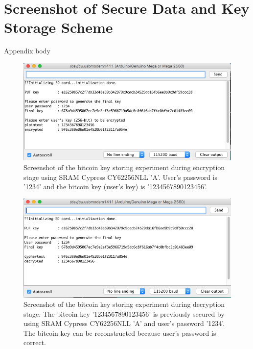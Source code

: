 \chapter{Screenshot of Secure Data and Key Storage Scheme}
\label{app:screenshot}
Appendix body

\begin{figure}[tph!]
    \centerline{\includegraphics[width={\textwidth}]{images/A_encrypt}}
    \caption{Screenshot of the bitcoin key storing experiment during encryption stage using SRAM Cypress CY62256NLL 'A'.
    User's password is '1234' and the bitcoin key (user's key) is '1234567890123456'.}
    \label{fig:A_encrypt}
\end{figure}

\begin{figure}[tph!]
    \centerline{\includegraphics[width={\textwidth}]{images/A_decrypt_correct}}
    \caption{Screenshot of the bitcoin key storing experiment during decryption stage. The bitcoin key '1234567890123456' is previously secured by using SRAM Cypress CY62256NLL 'A' and user's password '1234'.
    The bitcoin key can be reconstructed because user's password is correct.}
    \label{fig:A_decrypt_correct}
\end{figure}

